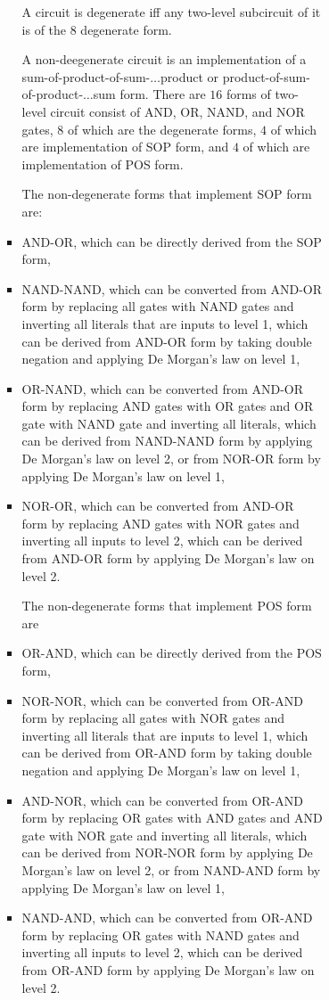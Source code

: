 \documentclass[a4paper,12pt]{article}
\begin{document}
\begin{itemize}
\begin{itemize}
\begin{itemize}
\begin{itemize}
\begin{itemize}
\begin{itemize}
\begin{itemize}
A circuit is degenerate iff any two-level subcircuit of it is of the $8$ degenerate form.

A non-deegenerate circuit is an implementation of a sum-of-product-of-sum-$\ldots$product or product-of-sum-of-product-$\ldots$sum form.
There are $16$ forms of two-level circuit consist of AND, OR, NAND, and NOR gates, $8$ of which are the degenerate forms, $4$ of which are implementation of SOP form, and $4$ of which are implementation of POS form.

The non-degenerate forms that implement SOP form are:
\bit
\item AND-OR, which can be directly derived from the SOP form,
\item NAND-NAND, which can be converted from AND-OR form by replacing all gates with NAND gates and inverting all literals that are inputs to level 1, which can be derived from AND-OR form by taking double negation and applying De Morgan's law on level 1,
\item OR-NAND, which can be converted from AND-OR form by replacing AND gates with OR gates and OR gate with NAND gate and inverting all literals, which can be derived from NAND-NAND form by applying De Morgan's law on level 2, or from NOR-OR form by applying De Morgan's law on level 1,
\item NOR-OR, which can be converted from AND-OR form by replacing AND gates with NOR gates and inverting all inputs to level 2, which can be derived from AND-OR form by applying De Morgan's law on level 2.
\eit

The non-degenerate forms that implement POS form are
\bit
\item OR-AND, which can be directly derived from the POS form,
\item NOR-NOR, which can be converted from OR-AND form by replacing all gates with NOR gates and inverting all literals that are inputs to level 1, which can be derived from OR-AND form by taking double negation and applying De Morgan's law on level 1,
\item AND-NOR, which can be converted from OR-AND form by replacing OR gates with AND gates and AND gate with NOR gate and inverting all literals, which can be derived from NOR-NOR form by applying De Morgan's law on level 2, or from NAND-AND form by applying De Morgan's law on level 1,
\item NAND-AND, which can be converted from OR-AND form by replacing OR gates with NAND gates and inverting all inputs to level 2, which can be derived from OR-AND form by applying De Morgan's law on level 2.
\eit


\end{itemize}
\end{itemize}
\end{itemize}
\end{itemize}
\end{itemize}
\end{itemize}
\end{itemize}
\end{document}
